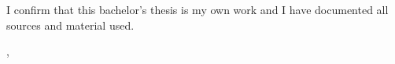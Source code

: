 \thispagestyle{empty}
\null
\vfill
\noindent
I confirm that this bachelor's thesis is my own work and I have documented all sources and material used.

\vspace{15mm}
\noindent
\getSubmissionLocation{}, \getSubmissionDate{} \hspace{50mm} \getAuthor{}

\cleardoublepage{}
